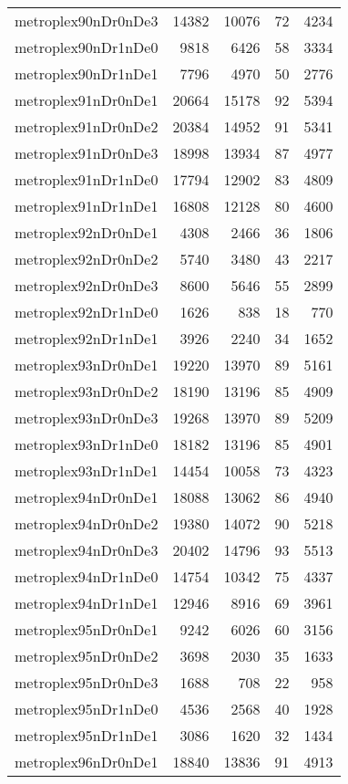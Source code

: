 \begin{longtable}{lrrrr}
metroplex90nDr0nDe3 & 14382 & 10076 & 72 & 4234 \\
metroplex90nDr1nDe0 & 9818 & 6426 & 58 & 3334 \\
metroplex90nDr1nDe1 & 7796 & 4970 & 50 & 2776 \\
metroplex91nDr0nDe1 & 20664 & 15178 & 92 & 5394 \\
metroplex91nDr0nDe2 & 20384 & 14952 & 91 & 5341 \\
metroplex91nDr0nDe3 & 18998 & 13934 & 87 & 4977 \\
metroplex91nDr1nDe0 & 17794 & 12902 & 83 & 4809 \\
metroplex91nDr1nDe1 & 16808 & 12128 & 80 & 4600 \\
metroplex92nDr0nDe1 & 4308 & 2466 & 36 & 1806 \\
metroplex92nDr0nDe2 & 5740 & 3480 & 43 & 2217 \\
metroplex92nDr0nDe3 & 8600 & 5646 & 55 & 2899 \\
metroplex92nDr1nDe0 & 1626 & 838 & 18 & 770 \\
metroplex92nDr1nDe1 & 3926 & 2240 & 34 & 1652 \\
metroplex93nDr0nDe1 & 19220 & 13970 & 89 & 5161 \\
metroplex93nDr0nDe2 & 18190 & 13196 & 85 & 4909 \\
metroplex93nDr0nDe3 & 19268 & 13970 & 89 & 5209 \\
metroplex93nDr1nDe0 & 18182 & 13196 & 85 & 4901 \\
metroplex93nDr1nDe1 & 14454 & 10058 & 73 & 4323 \\
metroplex94nDr0nDe1 & 18088 & 13062 & 86 & 4940 \\
metroplex94nDr0nDe2 & 19380 & 14072 & 90 & 5218 \\
metroplex94nDr0nDe3 & 20402 & 14796 & 93 & 5513 \\
metroplex94nDr1nDe0 & 14754 & 10342 & 75 & 4337 \\
metroplex94nDr1nDe1 & 12946 & 8916 & 69 & 3961 \\
metroplex95nDr0nDe1 & 9242 & 6026 & 60 & 3156 \\
metroplex95nDr0nDe2 & 3698 & 2030 & 35 & 1633 \\
metroplex95nDr0nDe3 & 1688 & 708 & 22 & 958 \\
metroplex95nDr1nDe0 & 4536 & 2568 & 40 & 1928 \\
metroplex95nDr1nDe1 & 3086 & 1620 & 32 & 1434 \\
metroplex96nDr0nDe1 & 18840 & 13836 & 91 & 4913 \\

\end{longtable}
